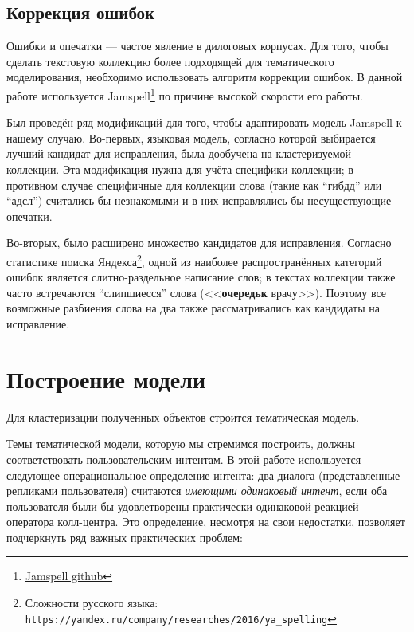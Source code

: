 \subsection{Коррекция ошибок}

\par Ошибки и опечатки --- частое явление в дилоговых корпусах. Для того, чтобы сделать текстовую коллекцию более подходящей для тематического моделирования, необходимо использовать алгоритм коррекции ошибок. В данной работе используется Jamspell\footnote{\href{https://github.com/bakwc/JamSpell}{Jamspell github}} по причине высокой скорости его работы.

\par Был проведён ряд модификаций для того, чтобы адаптировать модель Jamspell к нашему случаю. Во-первых, языковая модель, согласно которой выбирается лучший кандидат для исправления, была дообучена на кластеризуемой коллекции. Эта модификация нужна для учёта специфики коллекции; в противном случае специфичные для коллекции слова (такие как ``гибдд'' или ``адсл'') считались бы незнакомыми и в них исправлялись бы несуществующие опечатки.

Во-вторых, было расширено множество кандидатов для исправления. Согласно статистике поиска Яндекса\footnote{Сложности русского языка: \texttt{https://yandex.ru/company/researches/2016/ya\_spelling}}, одной из наиболее распространённых категорий ошибок является слитно-раздельное написание слов; в текстах коллекции также часто встречаются ``слипшиесся'' слова (<<\textbf{очередьк} врачу>>). Поэтому все возможные разбиения слова на два также рассматривались как кандидаты на исправление.

\section{Построение модели}
Для кластеризации полученных объектов строится тематическая модель. \par Темы тематической модели, которую мы стремимся построить, должны соответствовать пользовательским интентам. В этой работе используется следующее операциональное определение интента: два диалога (представленные репликами пользователя) считаются \textit{имеющими одинаковый интент}, если оба пользователя были бы удовлетворены практически одинаковой реакцией оператора колл-центра. Это определение, несмотря на свои недостатки, позволяет подчеркнуть ряд важных практических проблем:

